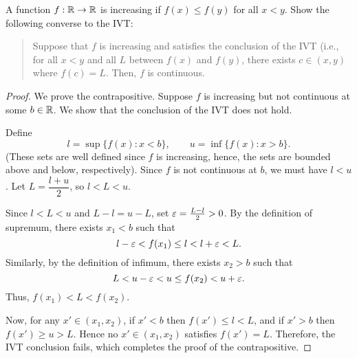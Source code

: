\begin{problem}
  A function $f : \mathbb{R} \to \mathbb{R}$ is increasing if $f(x) \leq f(y)$ for all $x < y$. Show the following converse to the IVT:

  \begin{quote}
    Suppose that $f$ is increasing and satisfies the conclusion of the IVT
    (i.e., for all $x < y$ and all $L$ between $f(x)$ and $f(y)$, there exists
    $c \in (x, y)$ where $f(c) = L$. Then, $f$ is continuous.
  \end{quote}

  \begin{proof}
    We prove the contrapositive. Suppose $f$ is increasing but not continuous
    at some $b \in \mathbb{R}$. We show that the conclusion of the IVT does not hold.

    Define
    \[
      l = \sup \{ f(x) : x < b \}, \qquad u = \inf \{ f(x) : x > b \}.
    \]
    (These sets are well defined since $f$ is increasing, hence, the sets are
    bounded above and below, respectively).
    Since $f$ is not continuous at $b$, we must have $l<u$.
    Let $L = \dfrac{l+u}{2}$, so $l < L < u$.

    Since $l < L < u$ and $L - l = u - L$, set $\varepsilon = \frac{L - l}{2} > 0$.
    By the definition of supremum, there exists $x_{1} < b$ such that
    \[
      l - \varepsilon < f(x_{1}) \le l < l + \varepsilon < L.
    \]
    Similarly, by the definition of infimum, there exists $x_{2} > b$ such that
    \[
      L < u - \varepsilon < u \leq f(x_{2}) < u + \varepsilon.
    \]
    Thus, $f(x_{1}) < L < f(x_{2})$.

    Now, for any $x'\in(x_{1},x_{2})$, if $x' < b$ then $f(x') \leq l < L$, and if
    $x' > b$ then $f(x') \geq u>L$. Hence no $x' \in (x_{1}, x_{2})$ satisfies
    $f(x') = L$.
    Therefore, the IVT conclusion fails, which completes the proof of the contrapositive.
  \end{proof}

\end{problem}

